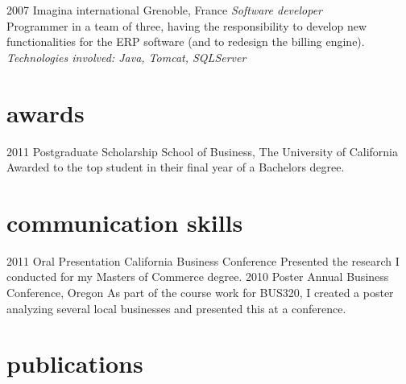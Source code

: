 \documentclass[]{k-cv} %
\begin{document}
\begin{entrylist}
\entry
{2007 }
{Imagina international}
{Grenoble, France}
{\emph{Software developer} \\
Programmer in a team of three, having the responsibility to develop
new functionalities for the ERP software (and to redesign the billing engine). \\
\emph{
Technologies involved:
Java, Tomcat, SQLServer
}}

\end{entrylist}




\section{awards}

\begin{entrylist}
\entry
{2011}
{Postgraduate Scholarship}
{School of Business, The University of California}
{Awarded to the top student in their final year of a Bachelors degree.}
\end{entrylist}


\section{communication skills}

\begin{entrylist}
\entry
{2011}
{Oral Presentation}
{California Business Conference}
{Presented the research I conducted for my Masters of Commerce degree.}
\entry
{2010}
{Poster}
{Annual Business Conference, Oregon}
{As part of the course work for BUS320, I created a poster analyzing several
local businesses and presented this at a conference.}
\end{entrylist}


\section{publications}
\end{document}
